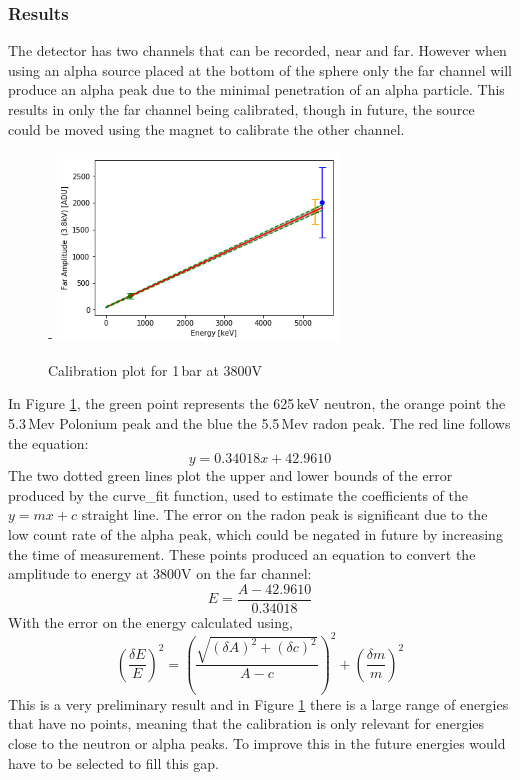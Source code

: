 \documentclass[a4paper]{article}
\begin{document}
\subsubsection{Results}
The detector has two channels that can be recorded, near and far. However when using an alpha source placed at the bottom of the sphere only the far channel will produce an alpha peak due to the minimal penetration of an alpha particle. This results in only the far channel being calibrated, though in future, the source could be moved using the magnet to calibrate the other channel. 
\begin{figure}[H]-
    \centering
    \includegraphics[height=5cm]{3800_2N.png}
    \caption{Calibration plot for 1\,bar at 3800V}
    \label{fig:cali}
\end{figure}
\noindent In Figure \ref{fig:cali}, the green point represents the 625\,keV neutron, the orange point the 5.3\,Mev Polonium peak and the blue the 5.5\,Mev radon peak. The red line follows the equation:
\begin{equation}
    y = 0.34018x + 42.9610
\end{equation}
The two dotted green lines plot the upper and lower bounds of the error produced by the curve\_fit function, used to estimate the coefficients of the $y=mx+c$ straight line. The error on the radon peak is significant due to the low count rate of the alpha peak, which could be negated in future by increasing the time of measurement. These points produced an equation to convert the amplitude to energy at 3800V on the far channel:
\begin{equation}
    E = \frac{A-42.9610}{0.34018}
\end{equation}
With the error on the energy calculated using,
\begin{equation} \label{eq:error}
    \left(\frac{\delta E}{E}\right)^2 = \left(\frac{\sqrt{(\delta A)^2 + (\delta c)^2}}{A-c}\right)^2+\left(\frac{\delta m}{m}\right)^2
\end{equation}
This is a very preliminary result and in Figure \ref{fig:cali} there is a large range of energies that have no points, meaning that the calibration is only relevant for energies close to the neutron or alpha peaks. To improve this in the future energies would have to be selected to fill this gap.
\end{document}
